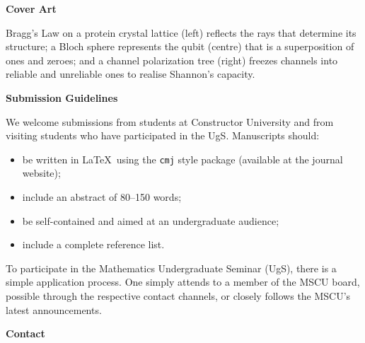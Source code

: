 \begin{minipage}[t]{0.47\textwidth}
    \vspace{\external}

      {\large\bfseries\color{cmjcrimson}Cover Art}

    Bragg's Law on a
    protein crystal lattice (left) reflects the rays that determine
    its structure; a Bloch sphere represents the qubit (centre) that is a 
    superposition of ones and zeroes; and a channel polarization tree 
    (right) freezes channels into reliable and unreliable ones to realise 
    Shannon's capacity.
\end{minipage}
\hfill
\begin{minipage}[t]{0.47\textwidth}

  {\large\bfseries\color{cmjcrimson}Submission Guidelines}

  \vspace{\internal}

  We welcome submissions from students at Constructor University and from
  visiting students who have participated in the UgS.
  Manuscripts should:
  \begin{itemize}[leftmargin=1.2em, itemsep=0.2em]
    \item be written in \LaTeX\ using the \texttt{cmj} style package
          (available at the journal website);
    \item include an abstract of 80--150 words;
    \item be self-contained and aimed at an undergraduate audience;
    \item include a complete reference list.
  \end{itemize}


  To participate in the Mathematics Undergraduate Seminar (UgS), there is a simple application 
  process. One simply attends to a member of the MSCU board, possible through
  the respective contact channels, or closely follows the MSCU's latest
  announcements.

  \vspace{\external}

    {\large\bfseries\color{cmjcrimson}Contact}


\end{minipage}
